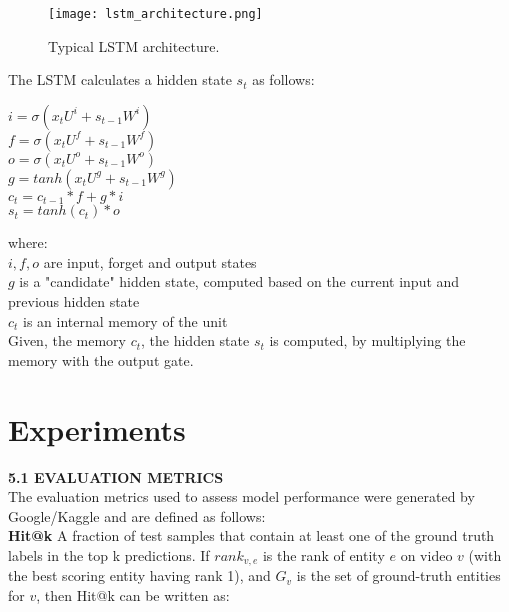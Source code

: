 \documentclass{sig-alternate-05-2015}
\begin{document}
\vspace{-3em}
\begin{figure}[h!]
\noindent
\small\caption{Typical LSTM architecture.}\small
\texttt{[image: lstm\_architecture.png]}
\end{figure}

\noindent 
\vspace{0em}
The LSTM calculates a hidden state $s_{t}$ as follows: \\

\vspace{-1em}
\begin{center}
$i = \sigma(x_{t}U^{i} + s_{t-1}W^{i}) $\\
$f = \sigma(x_{t}U^{f} + s_{t-1}W^{f}) $ \\
$o = \sigma(x_{t}U^{o} + s_{t-1}W^{o}) $ \\
$g = tanh(x_{t}U^{g} + s_{t-1}W^{g}) $ \\
$c_{t} = c_{t-1} *f + g*i$ \\
$s_{t} = tanh(c_{t}) * o $ \\
\end{center}

\noindent
where: \\
$i, f, o$ are input, forget and output states  \\
$g$ is a "candidate" hidden state, computed based on the current input and previous hidden state \\
$c_{t}$ is an internal memory of the unit \\

\noindent
Given, the memory $c_{t}$, the hidden state $s_{t}$ is computed, by multiplying the memory with the output gate. 



\vspace{2em}
\section{Experiments} 

\vspace{1em}
\noindent 
\textbf{5.1 EVALUATION METRICS} \\
\noindent
The evaluation metrics used to assess model performance were generated by Google/Kaggle and are defined as follows:  \\

\noindent 
\textbf{Hit@k} A fraction of test samples that contain at least one of the ground truth labels in the top k predictions. If $ rank_{v,e}$ is the rank of entity $e$ on video $v$ (with the best scoring entity having rank 1), and $G_{v}$ is the set of ground-truth entities for $v$, then Hit@k can be written as: \\
\end{document}
